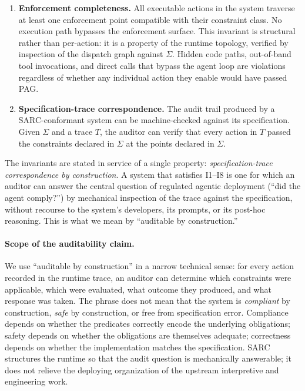 \documentclass[11pt,a4paper]{article}
\theoremstyle{remark}
\begin{document}
\begin{enumerate}[label={\textbf{I\arabic*}.},leftmargin=2.6em,topsep=0.3em,itemsep=0.4em]
\item \textbf{Enforcement completeness.} All executable actions in the system traverse at least one enforcement point compatible with their constraint class. No execution path bypasses the enforcement surface. This invariant is structural rather than per-action: it is a property of the runtime topology, verified by inspection of the dispatch graph against $\Sigma$. Hidden code paths, out-of-band tool invocations, and direct calls that bypass the agent loop are violations regardless of whether any individual action they enable would have passed PAG.

\item \textbf{Specification-trace correspondence.} The audit trail produced by a SARC-conformant system can be machine-checked against its specification. Given $\Sigma$ and a trace $T$, the auditor can verify that every action in $T$ passed the constraints declared in $\Sigma$ at the points declared in $\Sigma$.
\end{enumerate}

The invariants are stated in service of a single property: \emph{specification-trace correspondence by construction}. A system that satisfies I1--I8 is one for which an auditor can answer the central question of regulated agentic deployment (``did the agent comply?'') by mechanical inspection of the trace against the specification, without recourse to the system's developers, its prompts, or its post-hoc reasoning. This is what we mean by ``auditable by construction.''

\paragraph{Scope of the auditability claim.} We use ``auditable by construction'' in a narrow technical sense: for every action recorded in the runtime trace, an auditor can determine which constraints were applicable, which were evaluated, what outcome they produced, and what response was taken. The phrase does not mean that the system is \emph{compliant} by construction, \emph{safe} by construction, or free from specification error. Compliance depends on whether the predicates correctly encode the underlying obligations; safety depends on whether the obligations are themselves adequate; correctness depends on whether the implementation matches the specification. SARC structures the runtime so that the audit question is mechanically answerable; it does not relieve the deploying organization of the upstream interpretive and engineering work.
\end{document}
